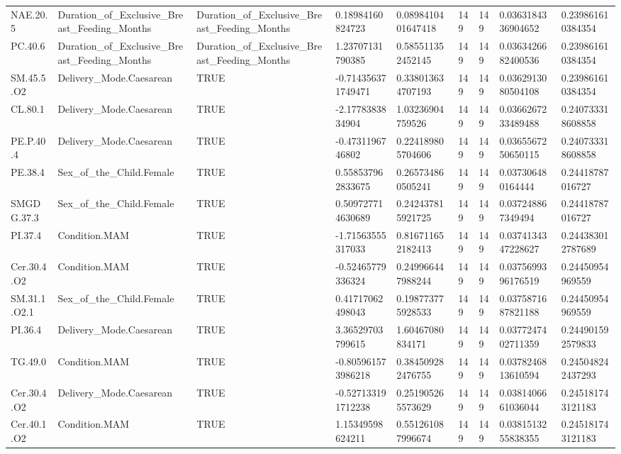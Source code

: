 \begin{longtable}{lllllllll}
NAE.20.5 & Duration\_of\_Exclusive\_Breast\_Feeding\_Months & Duration\_of\_Exclusive\_Breast\_Feeding\_Months & 0.18984160824723 & 0.0898410401647418 & 149 & 149 & 0.0363184336904652 & 0.239861610384354 \\
PC.40.6 & Duration\_of\_Exclusive\_Breast\_Feeding\_Months & Duration\_of\_Exclusive\_Breast\_Feeding\_Months & 1.23707131790385 & 0.585511352452145 & 149 & 149 & 0.0363426682400536 & 0.239861610384354 \\
SM.45.5.O2 & Delivery\_Mode.Caesarean & TRUE & -0.714356371749471 & 0.338013634707193 & 149 & 149 & 0.0362913080504108 & 0.239861610384354 \\
CL.80.1 & Delivery\_Mode.Caesarean & TRUE & -2.1778383834904 & 1.03236904759526 & 149 & 149 & 0.0366267233489488 & 0.240733318608858 \\
PE.P.40.4 & Delivery\_Mode.Caesarean & TRUE & -0.4731196746802 & 0.224189805704606 & 149 & 149 & 0.0365567250650115 & 0.240733318608858 \\
PE.38.4 & Sex\_of\_the\_Child.Female & TRUE & 0.558537962833675 & 0.265734860505241 & 149 & 149 & 0.037306480164444 & 0.24418787016727 \\
SMGDG.37.3 & Sex\_of\_the\_Child.Female & TRUE & 0.509727714630689 & 0.242437815921725 & 149 & 149 & 0.037248867349494 & 0.24418787016727 \\
PI.37.4 & Condition.MAM & TRUE & -1.71563555317033 & 0.816711652182413 & 149 & 149 & 0.0374134347228627 & 0.244383012787689 \\
Cer.30.4.O2 & Condition.MAM & TRUE & -0.52465779336324 & 0.249966447988244 & 149 & 149 & 0.0375699396176519 & 0.24450954969559 \\
SM.31.1.O2.1 & Sex\_of\_the\_Child.Female & TRUE & 0.41717062498043 & 0.198773775928533 & 149 & 149 & 0.0375871687821188 & 0.24450954969559 \\
PI.36.4 & Delivery\_Mode.Caesarean & TRUE & 3.36529703799615 & 1.60467080834171 & 149 & 149 & 0.0377247402711359 & 0.244901592579833 \\
TG.49.0 & Condition.MAM & TRUE & -0.805961573986218 & 0.384509282476755 & 149 & 149 & 0.0378246813610594 & 0.245048242437293 \\
Cer.30.4.O2 & Delivery\_Mode.Caesarean & TRUE & -0.527133191712238 & 0.251905265573629 & 149 & 149 & 0.0381406661036044 & 0.245181743121183 \\
Cer.40.1.O2 & Condition.MAM & TRUE & 1.15349598624211 & 0.551261087996674 & 149 & 149 & 0.0381513255838355 & 0.245181743121183 \\

\end{longtable}
